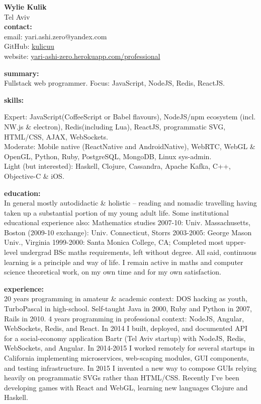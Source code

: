 



\normalFont \engrus
{\bf Wylie Kulik}
\\ Tel Aviv
\sectionSep
\\ {\bf contact:}
\\ email: yari.ashi.zero@yandex.com
\\ GitHub: \href{https://github.com/kulicuu}{kulicuu}
\\ website: \href{https://yari-ashi-zero.herokuapp.com/professional}{yari-ashi-zero.herokuapp.com/professional}

\sectionSep
{\bf summary:}
\\ Fullstack web programmer. Focus: JavaScript, NodeJS, Redis, ReactJS.

\sectionSep
{\bf skills:}

Expert: JavaScript(CoffeeScript or Babel flavours), NodeJS/npm ecosystem (incl. NW.js \& electron), Redis(including Lua), ReactJS, programmatic SVG, HTML/CSS, AJAX, WebSockets.
\\ Moderate: Mobile native (ReactNative and AndroidNative), WebRTC, WebGL \& OpenGL, Python, Ruby, PostgreSQL, MongoDB, Linux sys-admin.
\\ Light (but interested): Haskell, Clojure, Cassandra, Apache Kafka, C++, Objective-C \& iOS.

\sectionSep
{\bf education:}
\\ In general mostly autodidactic \& holistic -- reading and nomadic travelling having taken up a substantial portion of my young adult life. Some institutional educational experience also: Mathematics studies 2007-10: Univ. Massachusetts, Boston (2009-10 exchange): Univ. Connecticut, Storrs 2003-2005: George Mason Univ., Virginia 1999-2000: Santa Monica College, CA; Completed most upper-level undergrad BSc maths requirements, left without degree. All said, continuous learning is a principle and way of life. I remain active in maths and computer science theoretical work, on my own time and for my own satisfaction.

\sectionSep
{\bf experience:}
\\ 20 years programming in amateur \& academic context: DOS hacking as youth, TurboPascal in high-school. Self-taught Java in 2000, Ruby and Python in 2007, Rails in 2010.
4 years programming in professional context: NodeJS, Angular, WebSockets, Redis, and React. In 2014 I built, deployed, and documented API for a social-economy application Bartr (Tel Aviv startup) with NodeJS, Redis, WebSockets, and Angular. In 2014-2015 I worked remotely for several startups in California implementing microservices, web-scaping modules, GUI components, and testing infrastructure. In 2015 I invented a new way to compose GUIs relying heavily on programmatic SVGs rather than HTML/CSS. Recently I've been developing games with React and WebGL, learning new languages Clojure and Haskell.




